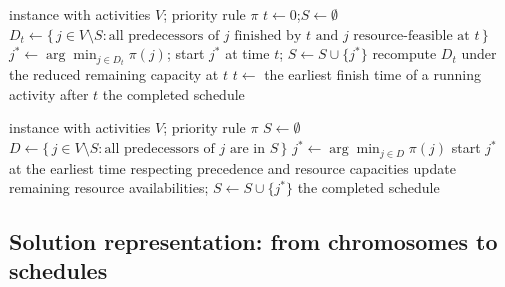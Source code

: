 \begin{algorithm}[htbp]
\caption[Parallel SGS with a priority rule]{}
\label{alg:parallel-sgs}
\begin{algorithmic}[1]
\Require instance with activities $V$; priority rule $\pi$
\State $t \gets 0$;\quad $S \gets \emptyset$ 
  \State $D_t \gets \{\, j \in V \setminus S : \text{all predecessors of } j$
    \Statex \hspace{\algorithmicindent}\hspace{\algorithmicindent}
    $\text{finished by } t \text{ and } j \text{ resource-feasible at } t \,\}$
    \State $j^{*} \gets \arg\min_{j \in D_t} \pi(j)$; start $j^{*}$ at time $t$;
      $S \gets S \cup \{j^{*}\}$
    \State recompute $D_t$ under the reduced remaining capacity at $t$
  \EndWhile
  \State $t \gets$ the earliest finish time of a running activity after $t$
\EndWhile
\State \Return the completed schedule
\end{algorithmic}
\end{algorithm}

\begin{algorithm}[htbp]
\caption[Serial SGS with a priority rule]{}
\label{alg:serial-sgs}
\begin{algorithmic}[1]
\Require instance with activities $V$; priority rule $\pi$
\State $S \gets \emptyset$ 
  \State $D \gets \{\, j \in V \setminus S : \text{all predecessors of } j \text{ are in } S \,\}$ 
  \State $j^{*} \gets \arg\min_{j \in D} \pi(j)$
  \State start $j^{*}$ at the earliest time respecting precedence and
    resource capacities
  \State update remaining resource availabilities; $S \gets S \cup \{j^{*}\}$
\EndWhile
\State \Return the completed schedule
\end{algorithmic}
\end{algorithm}

\subsection{Solution representation: from chromosomes to schedules}
\label{subsec:representation-intro}

